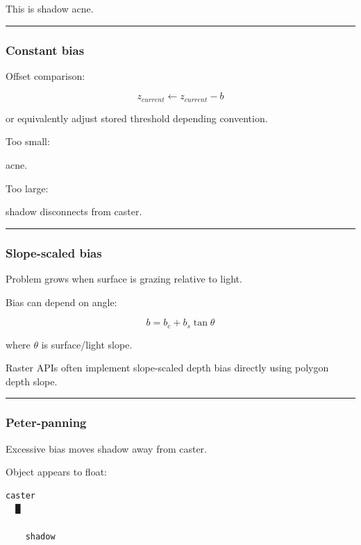 This is shadow acne.

\begin{center}\rule{0.5\linewidth}{0.5pt}\end{center}

\subsubsection{Constant bias}\label{constant-bias}

Offset comparison:

\[
z_{current}
\leftarrow
z_{current}-b
\]

or equivalently adjust stored threshold depending convention.

Too small:

acne.

Too large:

shadow disconnects from caster.

\begin{center}\rule{0.5\linewidth}{0.5pt}\end{center}

\subsubsection{Slope-scaled bias}\label{slope-scaled-bias}

Problem grows when surface is grazing relative to light.

Bias can depend on angle:

\[
\boxed{
b=
b_c+
b_s\tan\theta
}
\]

where \(\theta\) is surface/light slope.

Raster APIs often implement slope-scaled depth bias directly using polygon depth slope.

\begin{center}\rule{0.5\linewidth}{0.5pt}\end{center}

\subsubsection{Peter-panning}\label{peter-panning}

Excessive bias moves shadow away from caster.

Object appears to float:

\begin{verbatim}
caster
  █

    shadow
\end{verbatim}

